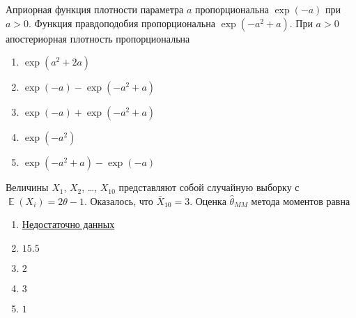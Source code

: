 \documentclass[t]{beamer}
\DeclareMathOperator{\E}{\mathbb{E}}
\begin{document}
 \begin{frame} \label{12} 
\begin{block}{12} 

  Априорная функция плотности параметра $a$  пропорциональна $\exp(-a)$ при $a>0$. Функция правдоподобия пропорциональна $\exp(-a^2+a)$. При $a>0$ апостериорная плотность пропорциональна


 \end{block} 
\begin{enumerate} 
\item[] \hyperlink{12-No}{\beamergotobutton{} $\exp(a^2+2a)$}
\item[] \hyperlink{12-No}{\beamergotobutton{} $\exp(-a) - \exp(-a^2+a)$}
\item[] \hyperlink{12-No}{\beamergotobutton{} $\exp(-a) + \exp(-a^2+a)$}
\item[] \hyperlink{12-Yes}{\beamergotobutton{} $\exp(-a^2)$}
\item[] \hyperlink{12-No}{\beamergotobutton{} $\exp(-a^2+a) - \exp(-a)$}
\end{enumerate} 
\end{frame} 


 \begin{frame} \label{13} 
\begin{block}{13} 

  Величины $X_1$, $X_2$, \ldots, $X_{10}$ представляют собой случайную выборку с $\E(X_i) = 2\theta - 1$. Оказалось, что $\bar X_{10}=3$. Оценка $\hat\theta_{MM}$ метода моментов равна


 \end{block} 
\begin{enumerate} 
\item[] \hyperlink{13-No}{\beamergotobutton{} Недостаточно данных}
\item[] \hyperlink{13-No}{\beamergotobutton{} $15.5$}
\item[] \hyperlink{13-Yes}{\beamergotobutton{} $2$}
\item[] \hyperlink{13-No}{\beamergotobutton{} $3$}
\item[] \hyperlink{13-No}{\beamergotobutton{} $1$}
\end{enumerate} 
\end{frame} 
\end{document}
